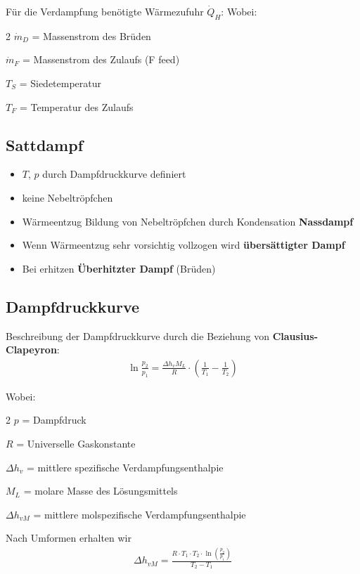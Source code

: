 \documentclass[a4paper,10pt]{article}
\begin{document}
Für die Verdampfung benötigte Wärmezufuhr $\dot{Q}_H$:
\pp
{}
\reversemarginpar
{}
\pp
Wobei: \par
\begin{multicols}{2}
$\dot{m}_D$ = Massenstrom des Brüden \par
$\dot{m}_F$ = Massenstrom des Zulaufs (F \RA feed) \par 
$T_S$ = Siedetemperatur \par 
$T_F$ = Temperatur des Zulaufs \par
\end{multicols}
\pagebreak
\subsection{Sattdampf}
\begin{itemize}
\item $T$, $p$ durch Dampfdruckkurve definiert
\item keine Nebeltröpfchen
\item Wärmeentzug \RA Bildung von Nebeltröpfchen durch Kondensation \RA \textbf{Nassdampf}
\item Wenn Wärmeentzug sehr vorsichtig vollzogen wird \RA \textbf{übersättigter Dampf}
\item Bei erhitzen \RA \textbf{Überhitzter Dampf} (Brüden)
\end{itemize}

\subsection{Dampfdruckkurve}
Beschreibung der Dampfdruckkurve durch die Beziehung von \textbf{Clausius-Clapeyron}:
\begin{align*}
\ln \frac{p_2}{p_1} = \frac{\Delta h_v M_L}{R} \cdot ( \frac{1}{T_1} - \frac{1}{T_2} )
\end{align*}

Wobei: \par
\begin{multicols}{2}
$p$ = Dampfdruck \par 
$R$ = Universelle Gaskonstante \par 
$\Delta h_v$ = mittlere spezifische Verdampfungsenthalpie \par 
$M_L$ = molare Masse des Lösungsmittels \par 
$\Delta h_{vM}$ = mittlere molspezifische Verdampfungsenthalpie
\end{multicols}
\pp
Nach Umformen erhalten wir
\begin{align*}
\Delta h_{vM} = \frac{R \cdot T_1 \cdot T_2 \cdot \ln(\frac{p_2}{p_1})}{T_2 - T_1}
\end{align*}
\end{document}
